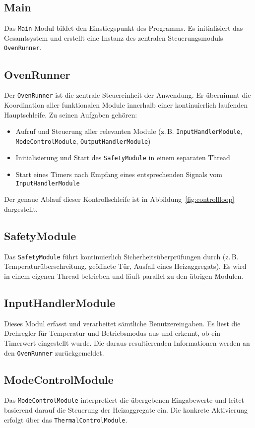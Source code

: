 \documentclass[a4paper,12pt]{article}
\begin{document}
\subsection*{Main}
Das \texttt{Main}-Modul bildet den Einstiegspunkt des Programms. Es initialisiert das Gesamtsystem und erstellt eine Instanz des zentralen Steuerungsmoduls \texttt{OvenRunner}.

\subsection*{OvenRunner}
Der \texttt{OvenRunner} ist die zentrale Steuereinheit der Anwendung. Er übernimmt die Koordination aller funktionalen Module innerhalb einer kontinuierlich laufenden Hauptschleife. Zu seinen Aufgaben gehören:
\begin{itemize}
    \item Aufruf und Steuerung aller relevanten Module (z.\,B. \texttt{InputHandlerModule}, \texttt{ModeControlModule}, \texttt{OutputHandlerModule})
    \item Initialisierung und Start des \texttt{SafetyModule} in einem separaten Thread
    \item Start eines Timers nach Empfang eines entsprechenden Signals vom \texttt{InputHandlerModule}
\end{itemize}
Der genaue Ablauf dieser Kontrollschleife ist in Abbildung~\ref{fig:controllloop} dargestellt.

\subsection*{SafetyModule}
Das \texttt{SafetyModule} führt kontinuierlich Sicherheitsüberprüfungen durch (z.\,B. Temperaturüberschreitung, geöffnete Tür, Ausfall eines Heizaggregats). Es wird in einem eigenen Thread betrieben und läuft parallel zu den übrigen Modulen.

\subsection*{InputHandlerModule}
Dieses Modul erfasst und verarbeitet sämtliche Benutzereingaben. Es liest die Drehregler für Temperatur und Betriebsmodus aus und erkennt, ob ein Timerwert eingestellt wurde. Die daraus resultierenden Informationen werden an den \texttt{OvenRunner} zurückgemeldet.

\subsection*{ModeControlModule}
Das \texttt{ModeControlModule} interpretiert die übergebenen Eingabewerte und leitet basierend darauf die Steuerung der Heizaggregate ein. Die konkrete Aktivierung erfolgt über das \texttt{ThermalControlModule}.
\end{document}
